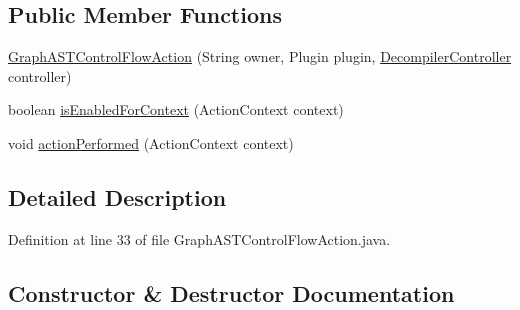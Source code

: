 \subsection*{Public Member Functions}
\begin{DoxyCompactItemize}
\item 
\mbox{\hyperlink{classghidra_1_1app_1_1plugin_1_1core_1_1decompile_1_1actions_1_1_graph_a_s_t_control_flow_action_a3989d62e1cbbafd0f4d420fbaef574b4}{Graph\+A\+S\+T\+Control\+Flow\+Action}} (String owner, Plugin plugin, \mbox{\hyperlink{classghidra_1_1app_1_1decompiler_1_1component_1_1_decompiler_controller}{Decompiler\+Controller}} controller)
\item 
boolean \mbox{\hyperlink{classghidra_1_1app_1_1plugin_1_1core_1_1decompile_1_1actions_1_1_graph_a_s_t_control_flow_action_ad6faa00a21c3961a1bf9f683112704b2}{is\+Enabled\+For\+Context}} (Action\+Context context)
\item 
void \mbox{\hyperlink{classghidra_1_1app_1_1plugin_1_1core_1_1decompile_1_1actions_1_1_graph_a_s_t_control_flow_action_ae1224abf771e50719a814edb0112c5bd}{action\+Performed}} (Action\+Context context)
\end{DoxyCompactItemize}


\subsection{Detailed Description}


Definition at line 33 of file Graph\+A\+S\+T\+Control\+Flow\+Action.\+java.



\subsection{Constructor \& Destructor Documentation}
\mbox{\label{classghidra_1_1app_1_1plugin_1_1core_1_1decompile_1_1actions_1_1_graph_a_s_t_control_flow_action_a3989d62e1cbbafd0f4d420fbaef574b4}} 
